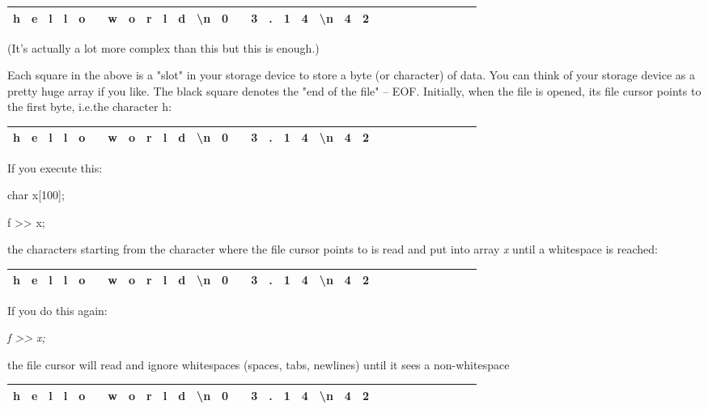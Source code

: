 \documentclass[
]{article}
\begin{document}
\begin{longtable}[]{@{}llllllllllllllllllllllllllllll@{}}
\toprule
\endhead
h & e & l & l & o & & w & o & r & l & d & \textbackslash n & 0 & & 3 & .
& 1 & 4 & \textbackslash n & 4 & 2 & & & & & & & & &\tabularnewline
\bottomrule
\end{longtable}

(It's actually a lot more complex than this but this is enough.)

Each square in the above is a "slot" in your storage device to store a
byte (or character) of data. You can think of your storage device as a
pretty huge array if you like. The black square denotes the "end of the
file" -- EOF. Initially, when the file is opened, its file cursor points
to the first byte, i.e.the character h:

\begin{longtable}[]{@{}llllllllllllllllllllllllllllll@{}}
\toprule
\endhead
h & e & l & l & o & & w & o & r & l & d & \textbackslash n & 0 & & 3 & .
& 1 & 4 & \textbackslash n & 4 & 2 & & & & & & & & &\tabularnewline
\bottomrule
\end{longtable}

If you execute this:

char x{[}100{]};

f \textgreater\textgreater{} x;

the characters starting from the character where the file cursor points
to is read and put into array \emph{x} until a whitespace is reached:

\begin{longtable}[]{@{}llllllllllllllllllllllllllllll@{}}
\toprule
\endhead
h & e & l & l & o & & w & o & r & l & d & \textbackslash n & 0 & & 3 & .
& 1 & 4 & \textbackslash n & 4 & 2 & & & & & & & & &\tabularnewline
\bottomrule
\end{longtable}

If you do this again:

\emph{f \textgreater\textgreater{} x;}

the file cursor will read and ignore whitespaces (spaces, tabs,
newlines) until it sees a non-whitespace

\begin{longtable}[]{@{}llllllllllllllllllllllllllllll@{}}
\toprule
\endhead
h & e & l & l & o & & w & o & r & l & d & \textbackslash n & 0 & & 3 & .
& 1 & 4 & \textbackslash n & 4 & 2 & & & & & & & & &\tabularnewline
\bottomrule
\end{longtable}
\end{document}
